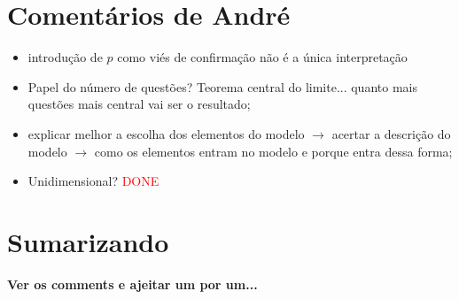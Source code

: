 \documentclass{article}
\begin{document}
\section*{Comentários de André}
\begin{itemize}
\item introdução de \(p\) como viés de confirmação não é a única interpretação
\item Papel do número de questões? Teorema central do limite... quanto mais
  questões mais central vai ser o resultado;
\item explicar melhor a escolha dos elementos do modelo \(\rightarrow\) acertar a
  descrição do modelo \(\rightarrow\) como os elementos entram no modelo e porque entra
  dessa forma;
\item Unidimensional? \textcolor{red}{DONE}
\end{itemize}

\section*{Sumarizando}
\textbf{Ver os comments  e ajeitar um por um...}
\end{document}
